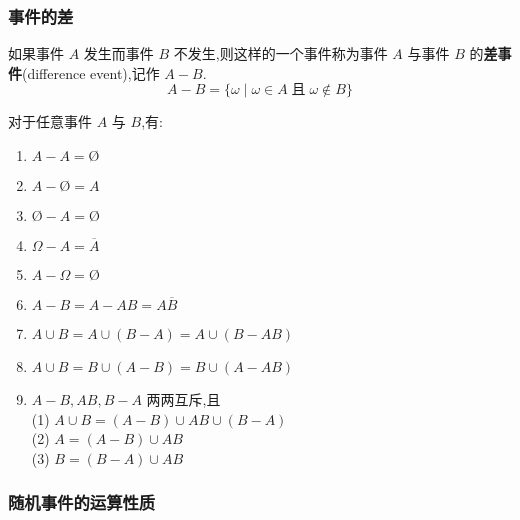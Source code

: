 \subsubsection{事件的差}

如果事件 $A$ 发生而事件 $B$ 不发生,则这样的一个事件称为事件 $A$ 与事件 $B$ 的\textbf{差事件}(difference event),记作 $A-B$.
$$
A - B = \{ \omega \mid \omega \in A \;\text{且}\; \omega \notin B \}
$$

\begin{property}
    \indent 对于任意事件 $A$ 与 $B$,有:
    \begin{enumerate}
        \item $A - A = \text{\O}$
        \item $A - \text{\O} = A$
        \item $\text{\O} - A = \text{\O}$
        \item $\varOmega - A = \overline{A}$
        \item $A - \varOmega = \text{\O}$
        \item $A - B = A - AB = A \overline{B}$
        \item $A \cup B = A \cup (B-A) = A \cup (B-AB)$
        \item $A \cup B = B \cup (A-B) = B \cup (A-AB)$
        \item $A-B, AB, B-A$ 两两互斥,且 \\
        (1) $A \cup B = (A-B) \cup AB \cup (B-A)$ \\
        (2) $A = (A-B) \cup AB$ \\
        (3) $B = (B-A) \cup AB$
    \end{enumerate}
\end{property}

\subsubsection{随机事件的运算性质}

